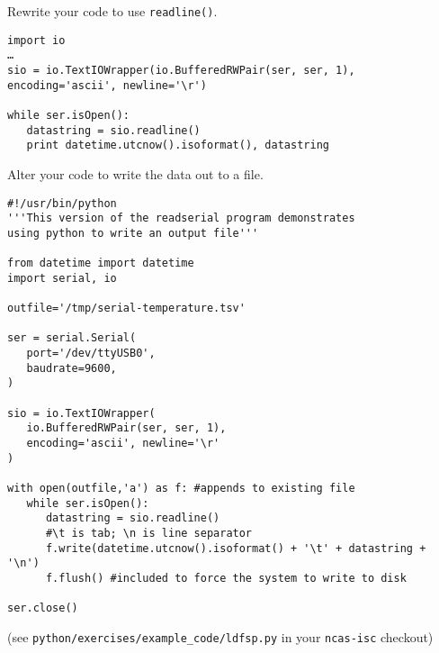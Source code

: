 \documentclass[a4paper,11pt]{article}
\begin{document}
\begin{question}
Rewrite your code to use \texttt{readline()}.
\end{question}
\newsavebox\readlinebox
\begin{lrbox}{\readlinebox}
\begin{minipage}{\textwidth}
\begin{verbatim}
import io
…
sio = io.TextIOWrapper(io.BufferedRWPair(ser, ser, 1), encoding='ascii', newline='\r')

while ser.isOpen():
   datastring = sio.readline()
   print datetime.utcnow().isoformat(), datastring
\end{verbatim}
\end{minipage}
\end{lrbox}

\begin{solution}
\noindent\usebox\readlinebox
\end{solution}
\begin{question}
Alter your code to write the data out to a file.
\end{question}

\newsavebox\logfile
\begin{lrbox}{\logfile}
\begin{minipage}{\textwidth}
\begin{verbatim}
#!/usr/bin/python
'''This version of the readserial program demonstrates
using python to write an output file'''

from datetime import datetime
import serial, io

outfile='/tmp/serial-temperature.tsv'

ser = serial.Serial(
   port='/dev/ttyUSB0',
   baudrate=9600,
)

sio = io.TextIOWrapper(
   io.BufferedRWPair(ser, ser, 1),
   encoding='ascii', newline='\r'
)

with open(outfile,'a') as f: #appends to existing file
   while ser.isOpen():
      datastring = sio.readline()
      #\t is tab; \n is line separator
      f.write(datetime.utcnow().isoformat() + '\t' + datastring + '\n')
      f.flush() #included to force the system to write to disk

ser.close()
\end{verbatim}
\end{minipage}
\end{lrbox}
\newpage
\begin{solution}
\noindent\usebox\logfile
\par
(see \texttt{python/exercises/example\_code/ldfsp.py} in your \texttt{ncas-isc} checkout)
\end{solution}
\newpage
\printsolutions
\end{document}
